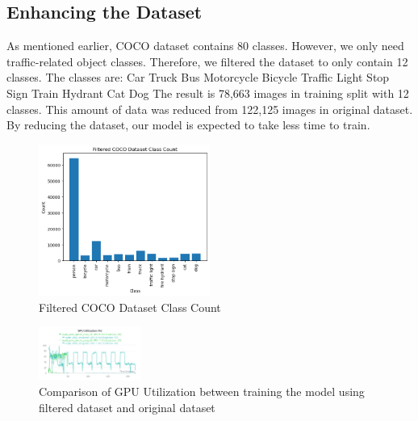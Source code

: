 \documentclass[conference]{IEEEtran}
\begin{document}
\subsection{Enhancing the Dataset}\label{Filtering}
As mentioned earlier, COCO dataset contains 80 classes. However, we only need traffic-related object classes.
Therefore, we filtered the dataset to only contain 12 classes. The classes are:
Car Truck Bus Motorcycle Bicycle Traffic Light Stop Sign Train Hydrant Cat Dog
The result is 78,663 images in training split with 12 classes. This amount of data was reduced from 122,125 images in original dataset. By reducing the dataset, our model is expected to take less time to train.
\begin{figure}[h!]
\centering
\includegraphics[width=0.5\textwidth]{filtered_coco_class_count.png}
\caption{Filtered COCO Dataset Class Count}
\label{fig:COCOFiltered}
\end{figure}

\begin{figure}[h!]
\centering
\includegraphics[width=0.3\textwidth,keepaspectratio]{gpu_utilization_comparison_original_and_filtered.png}
\caption{Comparison of GPU Utilization between training the model using filtered dataset and original dataset}
\label{fig:original_filtered_gpu_utilization}
\end{figure}
\end{document}
